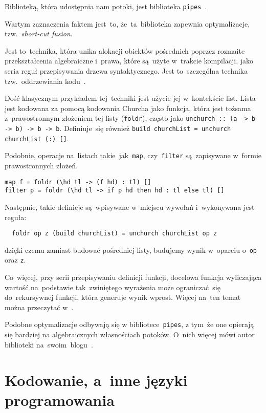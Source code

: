\documentclass[../../thesis.tex]{subfiles}
\begin{document}
Biblioteką, która udostępnia nam potoki, jest biblioteka \texttt{pipes}~\cite{Hackage:Pipes}.

Wartym zaznaczenia faktem jest~to, że~ta~biblioteka zapewnia optymalizacje,
tzw.~\emph{short-cut fusion}. 

Jest to~technika, która unika alokacji obiektów pośrednich poprzez rozmaite
przekształcenia algebraiczne i~prawa, które są~użyte w~trakcie kompilacji,
jako seria reguł przepisywania drzewa syntaktycznego. Jest to~szczególna
technika tzw.~oddrzewiania kodu~\cite{Gill:SCD}.

Dość klasycznym przykładem tej~techniki jest użycie jej w~kontekście list.
Lista jest kodowana za pomocą kodowania Churcha jako funkcja, która jest
tożsama z~prawostronnym złożeniem tej listy (\texttt{foldr}), często jako 
\texttt{unchurch :: (a -> b -> b) -> b -> b}.
Definiuje~się również \texttt{build churchList = unchurch churchList (:) []}.

Podobnie, operacje na~listach takie~jak~\texttt{map}, czy~\texttt{filter} 
są~zapisywane w~formie prawostronnych złożeń.

\begin{verbatim}
map f = foldr (\hd tl -> (f hd) : tl) []
filter p = foldr (\hd tl -> if p hd then hd : tl else tl) []
\end{verbatim}

Następnie, takie definicje są~wpisywane w~miejscu wywołań i~wykonywana jest reguła:
\begin{verbatim}
  foldr op z (build churchList) = unchurch churchList op z
\end{verbatim}
dzięki czemu zamiast budować pośredniej listy, budujemy wynik
w~oparciu o~\texttt{op} oraz \texttt{z}.

Co~więcej, przy serii przepisywaniu definicji funkcji, docelowa funkcja wyliczająca
wartość na~podstawie tak~zwiniętego wyrażenia może ograniczać~się do~rekursywnej funkcji,
która generuje wynik wprost. Więcej na~ten temat można przeczytać w~\cite{Gill:SCD}.

Podobne optymalizacje odbywają się w bibliotece~\texttt{pipes}, z tym~że one opierają się
bardziej na algebraicznych własnościach potoków. O~nich więcej mówi autor biblioteki
na~swoim~blogu~\cite{Gonzalez:SFP}.

\section{Kodowanie, a~inne języki programowania}
\end{document}
